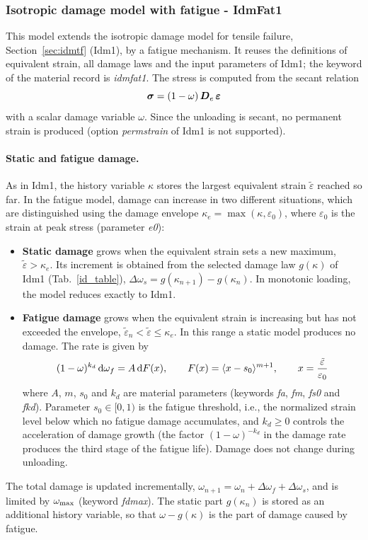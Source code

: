 \documentclass[a4paper]{article}
\newcommand{\mbf}[1]{\mbox{\boldmath$#1$}}
\begin{document}
\clearpage

\subsubsection{Isotropic damage model with fatigue - IdmFat1}
\label{sec:idmfat1}
This model extends the isotropic damage model for tensile failure, Section~\ref{sec:idmtf}
(Idm1), by a fatigue mechanism. It reuses the definitions of equivalent strain,
all damage laws and the input parameters of Idm1; the keyword of the material
record is {\it idmfat1}. The stress is computed from the secant relation
$$
\mbf{\sigma}=(1-\omega)\,\mbf{D}_e\,\mbf{\varepsilon}
$$
with a scalar damage variable $\omega$. Since the unloading is secant, no permanent strain
is produced (option {\it permstrain} of Idm1 is not supported).

\paragraph{Static and fatigue damage.}
As in Idm1, the history variable $\kappa$ stores the largest equivalent strain $\tilde\varepsilon$ reached so far.
In the fatigue model, damage can increase in two different situations, which are distinguished
using the damage envelope $\kappa_e=\max(\kappa,\varepsilon_0)$, where $\varepsilon_0$ is the
strain at peak stress (parameter {\it e0}):
\begin{itemize}
\item {\bf Static damage} grows when the equivalent strain sets a new maximum,
$\tilde\varepsilon>\kappa_e$. Its increment is obtained from the selected damage law $g(\kappa)$
of Idm1 (Tab.~\ref{id_table}), $\Delta\omega_s=g(\kappa_{n+1})-g(\kappa_n)$. In monotonic
loading, the model reduces exactly to Idm1.
\item {\bf Fatigue damage} grows when the equivalent strain is increasing but has not exceeded the envelope,
$\tilde\varepsilon_n<\tilde\varepsilon\le\kappa_e$. In this range a static model produces no damage.
The rate is given by
\begin{equation}
\label{fatigue_rate}
(1-\omega)^{k_d}\,{\rm d}\omega_f = A\,{\rm d}F(x),\qquad
F(x)=\langle x-s_0\rangle^{m+1},\qquad x=\frac{\tilde\varepsilon}{\varepsilon_0}
\end{equation}
where $A$, $m$, $s_0$ and $k_d$ are material parameters (keywords {\it fa}, {\it fm},
{\it fs0} and {\it fkd}). Parameter $s_0\in[0,1)$ is the fatigue threshold, i.e., the normalized
strain level below which no fatigue damage accumulates, and $k_d\ge 0$ controls the acceleration
of damage growth (the factor $(1-\omega)^{-k_d}$ in the damage rate produces the third stage of the fatigue life).
Damage does not change during unloading.
\end{itemize}
The total damage is updated incrementally, $\omega_{n+1}=\omega_n+\Delta\omega_f+\Delta\omega_s$, and is limited
by $\omega_{\rm max}$ (keyword {\it fdmax}). The static part $g(\kappa_n)$ is stored
as an additional history variable, so that $\omega-g(\kappa)$ is the part of damage caused by fatigue.
\end{document}

